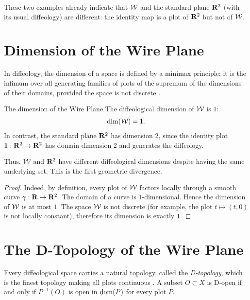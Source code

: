 These two examples already indicate that $\mathcal{W}$ and the standard plane $\mathbf{R}^2$ (with its usual diffeology) are different:
the identity map is a plot of $\mathbf{R}^2$ but not of $\mathcal{W}$.

\section{Dimension of the Wire Plane}

In diffeology,
the dimension of a space is defined by a minimax principle:
it is the infimum over all generating families of plots of the supremum of the dimensions of their domains,
provided the space is not discrete \cite[\textsection\,1.78]{PIZ13}.

\begin{Article}{The dimension of the Wire Plane}{}
  The diffeological dimension of $\mathcal{W}$ is $1$:
  $$%
    \dim(\cW) = 1.
    $$%
  In contrast,
  the standard plane $\mathbf{R}^2$ has dimension $2$,
  since the identity plot ${\mathbf{1}}: \mathbf{R}^2 \to \mathbf{R}^2$ has domain dimension $2$ and generates the diffeology.
  
  Thus,
  $\mathcal{W}$ and $\mathbf{R}^2$ have different diffeological dimensions
  despite having the same underlying set.
  This is the first geometric divergence.
\end{Article}

\begin{proof}
  Indeed,
  by definition,
  every plot of $\mathcal{W}$ factors locally through a smooth curve $\gamma: \mathbf{R} \to \mathbf{R}^2$.
  The domain of a curve is $1$-dimensional.
  Hence the dimension of $\mathcal{W}$ is at most $1$.
  The space $\mathcal{W}$ is not discrete
  (for example,
  the plot $t \mapsto (t,0)$ is not locally constant),
  therefore its dimension is exactly $1$.
\end{proof}

\section{The D-Topology of the Wire Plane}

Every diffeological space carries a natural topology,
called the \emph{D-topology},
which is the finest topology making all plots continuous \cite[\textsection\,2.8]{PIZ13}.
A subset $O \subset X$ is D-open if and only if $P^{-1}(O)$ is open in $\mathrm{dom}(P)$ for every plot $P$.

